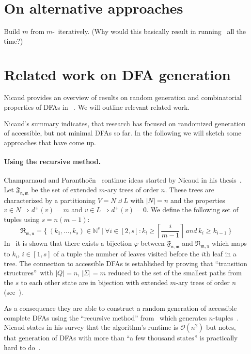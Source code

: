 \section{On alternative approaches}

Build $m$ from $m$-\CompDist\ iteratively. (Why would this basically result in running \CompDist\ all the time?)

\section{Related work on DFA generation}

Nicaud provides an overview of results on random generation and combinatorial properties of DFAs in ~\cite{Nic14}. We will outline relevant related work.

Nicaud's summary indicates, that research has focused on randomized generation of accessible, but not minimal DFAs so far. In the following we will sketch some approaches that have come up.

\paragraph*{Using the recursive method.}

Champarnaud and Paranthoën~\cite{CP05} continue ideas started by Nicaud in his thesis~\cite{Nic00}. Let $\mathfrak{F_{n,m}}$ be the set of extended $m$-ary trees of order $n$. These trees are characterized by a partitioning $V = N \uplus L$ with $|N| = n$ and the properties $v \in N \Rightarrow d^+(v) = m$ and $v \in L \Rightarrow d^+(v) = 0$. We define the following set of tuples using $s=n(m-1)$:
\[
    \mathfrak{R_{m,n}} = \{\ (k_1,\ldots,k_s) \in \mathbb{N}^s\ |\ \forall i\in [2,s]\colon k_i \geq \left\lceil\frac{i}{m-1}\right\rceil\ and\ k_i \geq k_{i-1}\ \}
\]
In~\cite[p. 6]{CP05} it is shown that there exists a bijection $\varphi$ between $\mathfrak{F_{n,m}}$ and $\mathfrak{R_{m,n}}$ which maps to $k_i$, $i\in[1,s]$ of a tuple the number of leaves visited before the $i$th leaf in a tree. The connection to accessible DFAs is established by proving that  ``transition structures\footnotemark''\ with $|Q|=n$, $|\Sigma|=m$ reduced to the set of the smallest paths from the $s$ to each other state are in bijection with extended $m$-ary trees of order $n$ (see~\cite[p. 8]{CP05}).

As a consequence they are able to construct a random generation of accessible complete DFAs using the ``recursive method'' from~\cite{NW78} which generates $n$-tuples~\cite[p. 10]{CP05}. Nicaud states in his survey that the algorithm's runtime is $\mathcal{O}(n^2)$ but notes, that generation of DFAs with more than ``a few thousand states'' is practically hard to do~\cite[pp. 10-11]{Nic14}.

